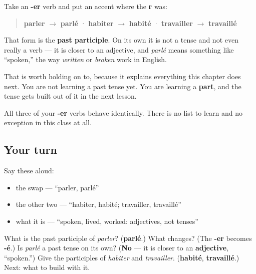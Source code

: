 \begin{grammarlens}[title={Grammar Lens: -er becomes -é}]
Take an \textbf{-er} verb and put an accent where the \textbf{r} was:

\begin{quote}
\textbf{parler} $\to$ \textbf{parlé} · \textbf{habiter} $\to$ \textbf{habité} · \textbf{travailler} $\to$ \textbf{travaillé}
\end{quote}

That form is the \textbf{past participle}. On its own it is not a tense and not even really a verb — it is closer to an adjective, and \emph{parlé} means something like \textquotedblleft{}spoken,\textquotedblright{} the way \emph{written} or \emph{broken} work in English.

That is worth holding on to, because it explains everything this chapter does next. You are not learning a past tense yet. You are learning a \textbf{part}, and the tense gets built out of it in the next lesson.

All three of your \textbf{-er} verbs behave identically. There is no list to learn and no exception in this class at all.
\end{grammarlens}

\subsection*{Your turn}
Say these aloud:

\begin{itemize}
\raggedright
  \item the swap — \textquotedblleft{}parler, parlé\textquotedblright{}
  \item the other two — \textquotedblleft{}habiter, habité; travailler, travaillé\textquotedblright{}
  \item what it is — \textquotedblleft{}spoken, lived, worked: adjectives, not tenses\textquotedblright{}
\end{itemize}

\begin{tcolorbox}[breakable,colback=teal!4,colframe=teal!35!black,title={Before you move on}]
What is the past participle of \emph{parler}? (\textbf{parlé}.) What changes? (The \textbf{-er} becomes \textbf{-é}.) Is \emph{parlé} a past tense on its own? (\textbf{No} — it is closer to an \textbf{adjective}, \textquotedblleft{}spoken.\textquotedblright{}) Give the participles of \emph{habiter} and \emph{travailler}. (\textbf{habité}, \textbf{travaillé}.) Next: what to build with it.
\end{tcolorbox}
